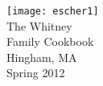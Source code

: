 \documentclass{book}
\begin{document}
\begin{center}
\vspace*{\fill}
\thispagestyle{empty}
\texttt{[image: escher1]}\\[1cm]
\Huge{The Whitney\\ Family Cookbook}\\ \vspace{0.5cm}
\LARGE{Hingham, MA}\\ \vspace{0.25cm}\Huge{Spring 2012}
\vspace*{\fill}
\end{center}
\newpage
\tableofcontents
\end{document}
